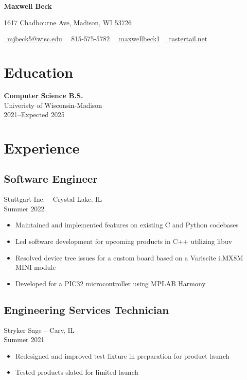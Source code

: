 \documentclass[letterpaper,10pt]{article}
\begin{document}
\raggedright

{\LARGE \bfseries Maxwell Beck}

\medskip

1617 Chadbourne Ave, Madison, WI 53726

\medskip

\href{mailto:mjbeck5@wisc.edu}{\faEnvelopeO\, mjbeck5@wisc.edu}
\, \faPhone\, 815-575-5782
\, \href{https://www.linkedin.com/in/maxwellbeck1}{\faLinkedin\, maxwellbeck1}
\, \href{https://rastertail.net/}{\faChain\, rastertail.net}

\section*{Education}

\textbf{Computer Science B.S.} \\
Univeristy of Wisconsin-Madison \\
2021--Expected 2025

\section*{Experience}

\subsection*{Software Engineer}
Stuttgart Inc. -- Crystal Lake, IL \\
Summer 2022

\begin{itemize}[topsep=0.5em, partopsep=0em, itemsep=0.125em]
    \item Maintained and implemented features on existing C and Python codebases
    \item Led software development for upcoming products in C++ utilizing libuv
    \item Resolved device tree issues for a custom board based on a Variscite i.MX8M MINI module
    \item Developed for a PIC32 microcontroller using MPLAB Harmony
\end{itemize}

\subsection*{Engineering Services Technician}
Stryker Sage -- Cary, IL \\
Summer 2021

\begin{itemize}[topsep=0.5em, partopsep=0em, itemsep=0.125em]
    \item Redesigned and improved test fixture in preparation for product launch
    \item Tested products slated for limited launch
\end{itemize}
\end{document}
